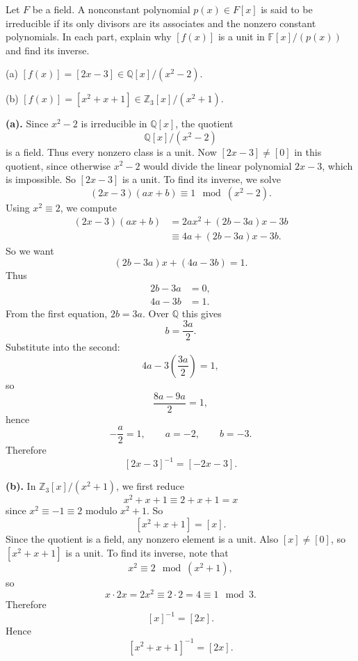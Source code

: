 \begin{problem}{
    Let $F$ be a field.
    A nonconstant polynomial $p(x)\in F[x]$ is said to be irreducible if its only divisors are its associates and the nonzero constant polynomials.
    In each part, explain why $[f(x)]$ is a unit in $\mathbb{F}[x]/(p(x))$ and find its inverse.

    (a) $[f(x)] = [2x-3]\in\mathbb{Q}[x]/(x^2-2)$.

    (b) $[f(x)] = [x^2+x+1]\in\mathbb{Z}_3[x]/(x^2+1)$.
}
    \textbf{(a).}
    Since $x^2-2$ is irreducible in $\mathbb{Q}[x]$, the quotient
    \[
        \mathbb{Q}[x]/(x^2-2)
    \]
    is a field.
    Thus every nonzero class is a unit.
    Now $[2x-3]\neq [0]$ in this quotient, since otherwise $x^2-2$ would divide the linear polynomial $2x-3$, which is impossible.
    So $[2x-3]$ is a unit.
    To find its inverse, we solve
    \[
        (2x-3)(ax+b)\equiv 1\mod (x^2-2).
    \]
    Using $x^2\equiv 2$, we compute
    \begin{align*}
        (2x-3)(ax+b)
&=
2ax^2+(2b-3a)x-3b\\
&\equiv
4a+(2b-3a)x-3b.
    \end{align*}
    So we want
    \[
        (2b-3a)x+(4a-3b)=1.
    \]
    Thus
    \begin{align*}
        2b-3a &= 0,\\
        4a-3b &= 1.
    \end{align*}
    From the first equation, $2b=3a$.
    Over $\mathbb{Q}$ this gives
    \[
        b=\frac{3a}{2}.
    \]
    Substitute into the second:
    \[
        4a-3\left(\frac{3a}{2}\right)=1,
    \]
    so
    \[
        \frac{8a-9a}{2}=1,
    \]
    hence
    \[
        -\frac{a}{2}=1,
        \qquad
        a=-2,
        \qquad
        b=-3.
    \]
    Therefore
    \[
        [2x-3]^{-1}=[-2x-3].
    \]

    \textbf{(b).}
    In $\mathbb{Z}_3[x]/(x^2+1)$, we first reduce
    \[
        x^2+x+1 \equiv 2+x+1 = x
    \]
    since $x^2\equiv -1\equiv 2$ modulo $x^2+1$.
    So
    \[
        [x^2+x+1]=[x].
    \]
    Since the quotient is a field, any nonzero element is a unit.
    Also $[x]\neq [0]$, so $[x^2+x+1]$ is a unit.
    To find its inverse, note that
    \[
        x^2\equiv 2 \mod (x^2+1),
    \]
    so
    \[
        x\cdot 2x = 2x^2 \equiv 2\cdot 2 = 4 \equiv 1 \mod 3.
    \]
    Therefore
    \[
        [x]^{-1}=[2x].
    \]
    Hence
    \[
        [x^2+x+1]^{-1}=[2x].
    \]
\end{problem}


